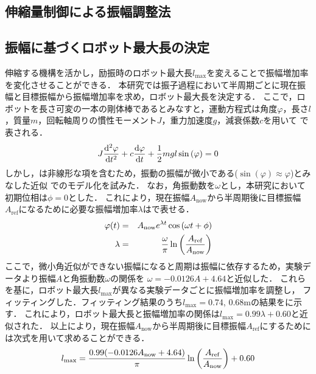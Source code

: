 \begin{small}
\section{伸縮量制御による振幅調整法}
\subsection{振幅に基づくロボット最大長の決定}
伸縮する機構を活かし，励振時のロボット最大長$l_{\mathrm{max}}$を変えることで振幅増加率を変化させることができる．
本研究では振子過程において半周期ごとに現在振幅と目標振幅から振幅増加率を求め，ロボット最大長を決定する．
ここで，ロボットを長さ可変の一本の剛体棒であるとみなすと，運動方程式は角度$\varphi$，長さ$l$，質量$m$，回転軸周りの慣性モーメント$J$，重力加速度$g$，減衰係数$c$を用いて
で表される．
\begin{eqnarray}
  \equlabel{equation}
  J \frac{\mathrm{d}^2 \varphi}{\mathrm{d} t^2} +c \frac{\mathrm{d}\varphi}{\mathrm{d} t}+\frac{1}{2}mgl \sin{(\varphi)}=0
\end{eqnarray}
しかし，は非線形な項を含むため，振動の振幅が微小である($\sin{(\varphi)}\approx \varphi$)とみなした近似
でのモデル化を試みた．
なお，角振動数を$\omega$とし，本研究において初期位相は$\phi=0$とした．
これにより，現在振幅$A_{\mathrm{now}}$から半周期後に目標振幅$A_{\mathrm{ref}}$になるために必要な振幅増加率$\lambda$はで表せる．
\begin{eqnarray}
  \equlabel{Approximation Model}
  \varphi(t)&=&A_{\mathrm{now}}e^{\lambda t}\cos{(\omega t + \phi)}\\
  \equlabel{lambda}
            \lambda&=&\frac{\omega}{\pi}\ln{\left(\frac{A_{\mathrm{ref}}}{A_{\mathrm{now}}}\right)}
\end{eqnarray}
ここで，微小角近似ができない振幅になると周期は振幅に依存するため，実験データより振幅$A$と角振動数$\omega$の関係を
$\omega=-0.0126A+4.64$と近似した．
これらを基に，ロボット最大長$l_{\mathrm{max}}$が異なる実験データごとに振幅増加率を調整し，
フィッティングした．フィッティング結果のうち$l_{\mathrm{max}}=$0.74, 0.68mの結果をに示す．
これにより，ロボット最大長と振幅増加率の関係は$l_{\mathrm{max}}=0.99\lambda+0.60$と近似された．
以上により，現在振幅$A_{\mathrm{now}}$から半周期後に目標振幅$A_{\mathrm{ref}}$にするためには次式を用いて求めることができる．
\begin{eqnarray}
  \equlabel{l status}
  l_{\mathrm{max}}=\frac{0.99(-0.0126A_{\mathrm{now}}+4.64)}{\pi}\ln{\left(\frac{A_{\mathrm{ref}}}{A_{\mathrm{now}}}\right)}+0.60 \nonumber
\end{eqnarray}

\end{small}
